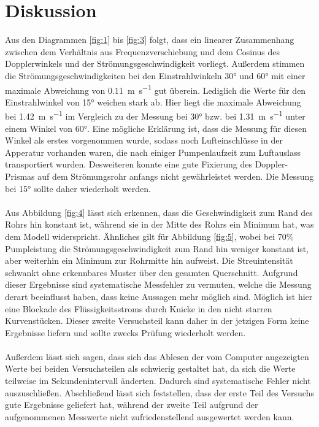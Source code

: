 \section{Diskussion}
Aus den Diagrammen \ref{fig:1} bis \ref{fig:3} folgt, dass ein linearer Zusammenhang
zwischen dem Verhältnis aus Frequenzverschiebung und dem Cosinus des Dopplerwinkels und
der Strömungsgeschwindigkeit vorliegt. Außerdem stimmen die Strömungsgeschwindigkeiten bei
den Einstrahlwinkeln 30° und 60° mit einer maximale Abweichung von \SI{0.11}{\meter\per\second}
gut überein. Lediglich die Werte für den Einstrahlwinkel von 15° weichen stark ab. Hier liegt die
maximale Abweichung bei \SI{1.42}{\meter\per\second} im Vergleich zu der Messung bei 30°
bzw. bei \SI{1.31}{\meter\per\second} unter einem Winkel von 60°. Eine mögliche
Erklärung ist, dass die Messung für diesen Winkel als erstes vorgenommen wurde, sodass
noch Lufteinschlüsse in der Apperatur vorhanden waren, die nach einiger Pumpenlaufzeit
zum Luftauslass transportiert wurden. Desweiteren konnte eine gute Fixierung des Doppler-Prismas
auf dem Strömungsrohr anfangs nicht gewährleistet werden. Die Messung bei 15° sollte
daher wiederholt werden.\\
\\
Aus Abbildung \ref{fig:4} lässt sich erkennen, dass die Geschwindigkeit zum Rand des Rohrs hin
konstant ist, während sie in der Mitte des Rohrs ein Minimum hat, was dem Modell widerspricht.
Ähnliches gilt für Abbildung \ref{fig:5}, wobei bei 70\% Pumpleistung die Strömungsgeschwindigkeit zum Rand hin weniger
konstant ist, aber weiterhin ein Minimum zur Rohrmitte hin aufweist.
Die Streuintensität schwankt ohne erkennbares Muster über den gesamten
Querschnitt. Aufgrund dieser Ergebnisse sind systematische Messfehler zu vermuten,
welche die Messung derart beeinflusst haben, dass keine Aussagen mehr möglich sind.
Möglich ist hier eine Blockade des Flüssigkeitsstroms durch Knicke in den nicht
starren Kurvenstücken. Dieser zweite Versuchsteil kann daher in der jetzigen Form keine Ergebnisse
liefern und sollte zwecks Prüfung wiederholt werden.\\
\\
Außerdem lässt sich sagen, dass sich das Ablesen der vom Computer angezeigten Werte bei beiden Versuchsteilen
als schwierig gestaltet hat, da sich die Werte teilweise im Sekundenintervall änderten.
Dadurch sind systematische Fehler nicht auszuschließen. Abschließend lässt sich feststellen,
dass der erste Teil des Versuchs gute Ergebnisse geliefert hat, während der zweite Teil
aufgrund der aufgenommenen Messwerte nicht zufriedenstellend ausgewertet werden kann.
\newpage
\nocite{*}
\printbibliography
